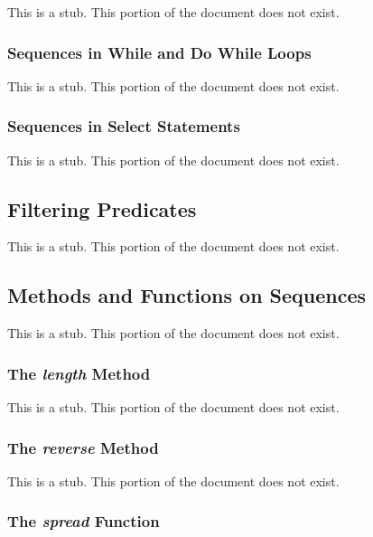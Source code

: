 This is a stub.  This portion of the document does not exist.

\subsubsection{Sequences in While and Do While Loops}
\label{Sequences_in_While_and_Do_While_Loops}

This is a stub.  This portion of the document does not exist.

\subsubsection{Sequences in Select Statements}
\label{Sequences_in_Select_Statements}

This is a stub.  This portion of the document does not exist.

\subsection{Filtering Predicates}
\label{Filtering_Predicates}

This is a stub.  This portion of the document does not exist.

\subsection{Methods and Functions on Sequences}
\label{Methods_and_Functions_on_Sequences}

This is a stub.  This portion of the document does not exist.

\subsubsection{The {\em length} Method}
\label{The_em_length_Method}

This is a stub.  This portion of the document does not exist.

\subsubsection{The {\em reverse} Method}
\label{The_em_reverse_Method}

This is a stub.  This portion of the document does not exist.

\subsubsection{The {\em spread} Function}
\label{The_em_spread_Function}

